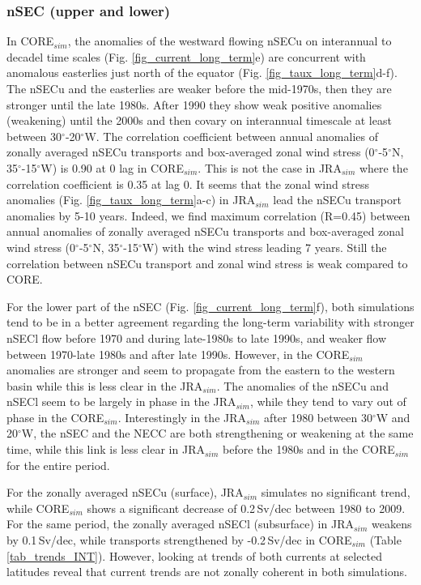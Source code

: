 \documentclass[os, manuscript]{copernicus}
\begin{document}
\subsubsection{nSEC (upper and lower)}
In CORE$_{sim}$, the anomalies of the westward flowing nSECu on interannual to decadel time scales (Fig. \ref{fig_current_long_term}e) are concurrent with anomalous easterlies just north of the equator (Fig. \ref{fig_taux_long_term}d-f). The nSECu and the easterlies are weaker before the mid-1970s, then they are stronger until the late 1980s. After 1990 they show weak positive anomalies (weakening) until the 2000s and then covary on interannual timescale at least between 30$^{\circ}$-20$^{\circ}$W. The correlation coefficient between annual anomalies of zonally averaged nSECu transports and box-averaged zonal wind stress (0$^{\circ}$-5$^{\circ}$N, 35$^{\circ}$-15$^{\circ}$W) is 0.90 at 0 lag in CORE$_{sim}$. This is not the case in JRA$_{sim}$ where the correlation coefficient is 0.35 at lag 0. It seems that the zonal wind stress anomalies (Fig. \ref{fig_taux_long_term}a-c) in JRA$_{sim}$ lead the nSECu transport anomalies by 5-10 years. Indeed, we find maximum correlation (R=0.45) between annual anomalies of zonally averaged nSECu transports and box-averaged zonal wind stress (0$^{\circ}$-5$^{\circ}$N, 35$^{\circ}$-15$^{\circ}$W) with the wind stress leading 7 years. Still the correlation between nSECu transport and zonal wind stress is weak compared to CORE.

For the lower part of the nSEC (Fig. \ref{fig_current_long_term}f), both simulations tend to be in a better agreement regarding the long-term variability with stronger nSECl flow before 1970 and during late-1980s to late 1990s, and weaker flow between 1970-late 1980s and after late 1990s. However, in the CORE$_{sim}$ anomalies are stronger and seem to propagate from the eastern to the western basin while this is less clear in the JRA$_{sim}$. The anomalies of the nSECu and nSECl seem to be largely in phase in the JRA$_{sim}$, while they tend to vary out of phase in the CORE$_{sim}$. Interestingly in the JRA$_{sim}$ after 1980 between 30$^{\circ}$W and 20$^{\circ}$W, the nSEC and the NECC are both strengthening or weakening at the same time, while this link is less clear in JRA$_{sim}$ before the 1980s and in the CORE$_{sim}$ for the entire period. 

For the zonally averaged nSECu (surface), JRA$_{sim}$ simulates no significant trend, while CORE$_{sim}$ shows a significant decrease of 0.2$\,$Sv/dec between 1980 to 2009. For the same period, the zonally averaged nSECl (subsurface) in JRA$_{sim}$ weakens by 0.1$ \, $Sv/dec, while transports strengthened by -0.2$ \, $Sv/dec in CORE$_{sim}$ (Table \ref{tab_trends_INT}). However, looking at trends of both currents at selected latitudes reveal that current trends are not zonally coherent in both simulations. 
\end{document}
